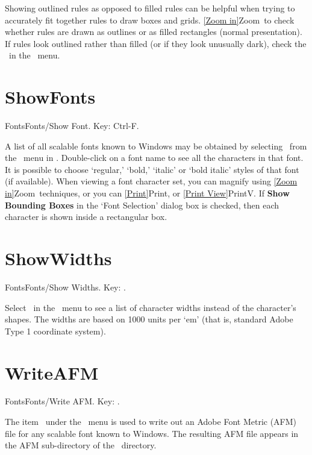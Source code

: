 Showing outlined rules as opposed to filled rules can be helpful when
trying to accurately fit together rules to draw boxes and grids.
\ref{Zoom in}{Zoom}\ to check whether rules are drawn as outlines
or as filled rectangles (normal presentation).
    \medskip
If rules look outlined rather than filled (or if they look unusually dark),
check the \ in the \ menu.
   \bigskip

\newpage

\section{ShowFonts}{Fonts}Fonts/Show Font\ellipses.  Key: Ctrl-F.


A list of all scalable fonts known to Windows may be obtained by selecting
\ from the \ menu in .
Double-click on a font name to see all the characters in that font.  It is
possible to choose `regular,' `bold,' `italic' or `bold italic'
styles of that font (if available).
   \bigskip
When viewing a font character set, you can magnify using \ref{Zoom in}{Zoom}\
techniques, or you can \ref{Print}{Print}, or \ref{Print View}{PrintV}.
   \bigskip
If {\bf Show Bounding Boxes} in the `Font Selection' dialog box is checked,
then each character is shown inside a rectangular box.
    \bigskip

\section{ShowWidths}{Fonts}Fonts/Show Widths\ellipses. Key: \none.

Select \ in the \ menu to see a list of character
widths instead of the character's shapes.  The widths are based on 1000
units per `em' (that is, standard Adobe Type 1 coordinate system).
   \bigskip

\newpage

\section{WriteAFM}{Fonts}Fonts/Write AFM\ellipses. Key: \none.

The item \ under the \ menu is used to write
out an Adobe Font Metric (AFM) file for any scalable font known to Windows.
The resulting AFM file appears in the AFM sub-directory of the
\ directory.
   \bigskip

